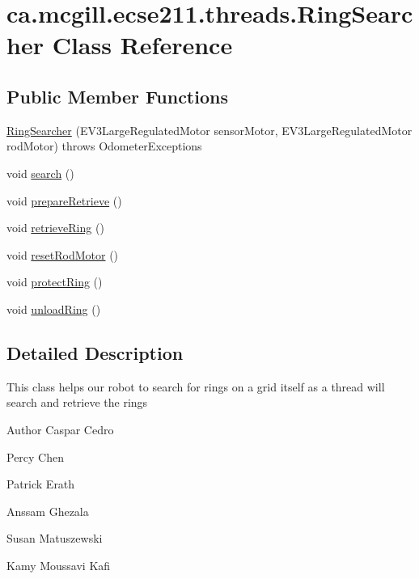 \hypertarget{classca_1_1mcgill_1_1ecse211_1_1threads_1_1_ring_searcher}{}\section{ca.\+mcgill.\+ecse211.\+threads.\+Ring\+Searcher Class Reference}
\label{classca_1_1mcgill_1_1ecse211_1_1threads_1_1_ring_searcher}
\subsection*{Public Member Functions}
\begin{DoxyCompactItemize}
\item 
\hyperlink{classca_1_1mcgill_1_1ecse211_1_1threads_1_1_ring_searcher_af36dd15db12c915245199bef646137ed}{Ring\+Searcher} (E\+V3\+Large\+Regulated\+Motor sensor\+Motor, E\+V3\+Large\+Regulated\+Motor rod\+Motor)  throws Odometer\+Exceptions 
\item 
void \hyperlink{classca_1_1mcgill_1_1ecse211_1_1threads_1_1_ring_searcher_abd2b2c172ea393ce4185027c8a12780f}{search} ()
\item 
void \hyperlink{classca_1_1mcgill_1_1ecse211_1_1threads_1_1_ring_searcher_a6cbee26320e250b07e4f4b14f60d39a0}{prepare\+Retrieve} ()
\item 
void \hyperlink{classca_1_1mcgill_1_1ecse211_1_1threads_1_1_ring_searcher_abd7a2651a7c5de76a018664c8bf327af}{retrieve\+Ring} ()
\item 
void \hyperlink{classca_1_1mcgill_1_1ecse211_1_1threads_1_1_ring_searcher_a3d6f49addfa2bd5d61903287c68aefd6}{reset\+Rod\+Motor} ()
\item 
void \hyperlink{classca_1_1mcgill_1_1ecse211_1_1threads_1_1_ring_searcher_a17ca33f66eca9dd1ad822f99849296ec}{protect\+Ring} ()
\item 
void \hyperlink{classca_1_1mcgill_1_1ecse211_1_1threads_1_1_ring_searcher_a105b1aaaca38a9466c125318175f192c}{unload\+Ring} ()
\end{DoxyCompactItemize}


\subsection{Detailed Description}
This class helps our robot to search for rings on a grid itself as a thread will search and retrieve the rings

\begin{DoxyAuthor}{Author}
Caspar Cedro 

Percy Chen 

Patrick Erath 

Anssam Ghezala 

Susan Matuszewski 

Kamy Moussavi Kafi 
\end{DoxyAuthor}


